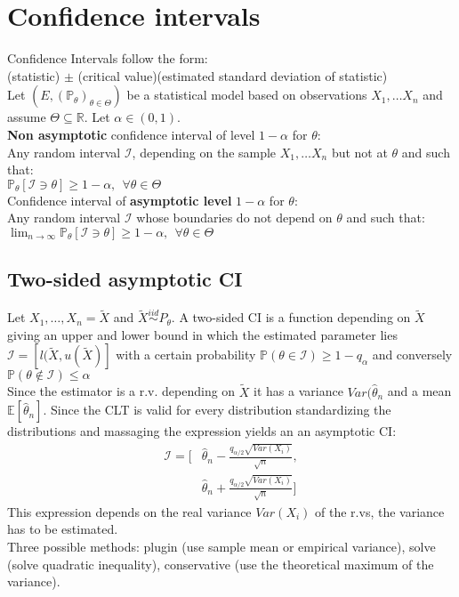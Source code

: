 \section{Confidence intervals}

Confidence Intervals follow the form:\\

(statistic) $\pm$ (critical value)(estimated standard deviation of statistic)\\

Let $\displaystyle ( E,(\mathbb{P}_{\theta })_{\theta \in \Theta })$ be a statistical  model based on observations $X_{1} , \ldots X_{n}$  and assume $\displaystyle \Theta \subseteq \mathbb{R}$. Let $\displaystyle \alpha \in ( 0,1)$.\\
\textbf{Non asymptotic} confidence interval of level $\displaystyle 1-\alpha $ for $\displaystyle \theta $:\\
Any random interval $\displaystyle \mathcal{I}$, depending on the sample $X_{1} , \ldots X_{n}$ but not at $\displaystyle \theta $ and such that:\\
$\mathbb{P}_{\theta }[\mathcal{I} \ni \theta ] \geq 1-\alpha ,\ \ \forall \theta \in \Theta$\\
Confidence interval of \textbf{asymptotic level} $\displaystyle 1-\alpha $  for $\displaystyle \theta $:\\
Any random interval $\displaystyle \mathcal{I}$ whose boundaries do not depend on $\displaystyle \theta $ and such that: $\lim _{n\rightarrow \infty }\mathbb{P}_{\theta } [\mathcal{I} \ni \theta ]\geq 1-\alpha ,\ \ \forall \theta \in \Theta $
\subsection{Two-sided asymptotic CI}
Let $X_1, \ldots, X_n = \tilde{X}$ and $\tilde{X}\stackrel{iid} {\sim} P_{\theta}$. A two-sided CI is a function depending on $\tilde{X}$ giving an upper and lower bound in which the estimated parameter lies $\mathcal{I} = [l(\tilde{X},u(\tilde{X})]$ with a certain probability $\mathbb{P}(\theta \in  \mathcal{I}) \geq 1 -q_{\alpha}$ and conversely $\mathbb{P}(\theta \not\in  \mathcal{I}) \leq \alpha$\\
Since the estimator is a r.v. depending on $\tilde{X}$ it has a variance $Var(\hat{\theta}_n$ and a mean $\mathbb{E}[\hat{\theta}_n]$. 
Since the CLT is valid for every distribution standardizing the distributions and massaging the expression yields an an asymptotic CI:
\begin{align*}
\mathcal{I} =  [&\hat{\theta}_n - \frac{q_{\alpha /2} \sqrt{Var(X_i)} }{\sqrt{n}},\\
&\hat{\theta}_n + \frac{q_{\alpha /2} \sqrt{Var(X_i)} }{\sqrt{n}}]
\end{align*}
This expression depends on the real variance $Var(X_i)$ of the r.vs, the variance has to be estimated.\\
Three possible methods: plugin (use sample mean or empirical variance), solve (solve quadratic inequality), conservative (use the theoretical maximum of the variance).
